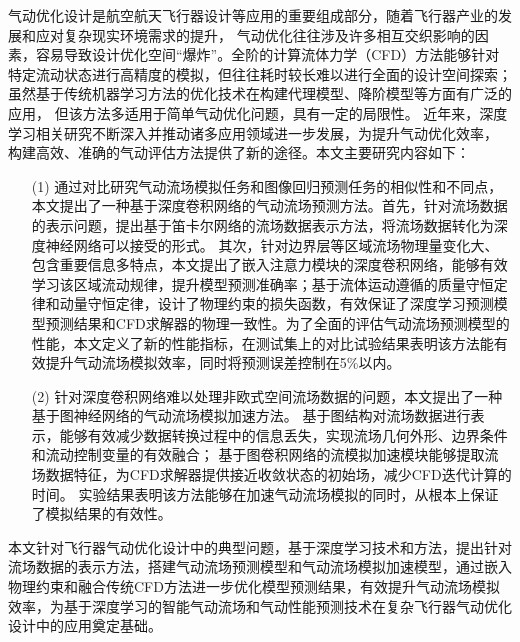 \begin{cabstract}

气动优化设计是航空航天飞行器设计等应用的重要组成部分，随着飞行器产业的发展和应对复杂现实环境需求的提升，
气动优化往往涉及许多相互交织影响的因素，容易导致设计优化空间“爆炸”。全阶的计算流体力学（CFD）方法能够针对特定流动状态进行高精度的模拟，但往往耗时较长难以进行全面的设计空间探索；虽然基于传统机器学习方法的优化技术在构建代理模型、降阶模型等方面有广泛的应用，
但该方法多适用于简单气动优化问题，具有一定的局限性。
近年来，深度学习相关研究不断深入并推动诸多应用领域进一步发展，为提升气动优化效率，
构建高效、准确的气动评估方法提供了新的途径。本文主要研究内容如下：

\begin{itemize}
	\item[(1)] 通过对比研究气动流场模拟任务和图像回归预测任务的相似性和不同点，本文提出了一种基于深度卷积网络的气动流场预测方法。首先，针对流场数据的表示问题，提出基于笛卡尔网络的流场数据表示方法，将流场数据转化为深度神经网络可以接受的形式。
	其次，针对边界层等区域流场物理量变化大、包含重要信息多特点，本文提出了嵌入注意力模块的深度卷积网络，能够有效学习该区域流动规律，提升模型预测准确率；基于流体运动遵循的质量守恒定律和动量守恒定律，设计了物理约束的损失函数，有效保证了深度学习预测模型预测结果和CFD求解器的物理一致性。为了全面的评估气动流场预测模型的性能，本文定义了新的性能指标，在测试集上的对比试验结果表明该方法能有效提升气动流场模拟效率，同时将预测误差控制在5\%以内。
	\item[(2)] 针对深度卷积网络难以处理非欧式空间流场数据的问题，本文提出了一种基于图神经网络的气动流场模拟加速方法。
	基于图结构对流场数据进行表示，能够有效减少数据转换过程中的信息丢失，实现流场几何外形、边界条件和流动控制变量的有效融合；
	基于图卷积网络的流模拟加速模块能够提取流场数据特征，为CFD求解器提供接近收敛状态的初始场，减少CFD迭代计算的时间。
	实验结果表明该方法能够在加速气动流场模拟的同时，从根本上保证了模拟结果的有效性。
	
\end{itemize}

本文针对飞行器气动优化设计中的典型问题，基于深度学习技术和方法，提出针对流场数据的表示方法，搭建气动流场预测模型和气动流场模拟加速模型，通过嵌入物理约束和融合传统CFD方法进一步优化模型预测结果，有效提升气动流场模拟效率，为基于深度学习的智能气动流场和气动性能预测技术在复杂飞行器气动优化设计中的应用奠定基础。

\end{cabstract}



